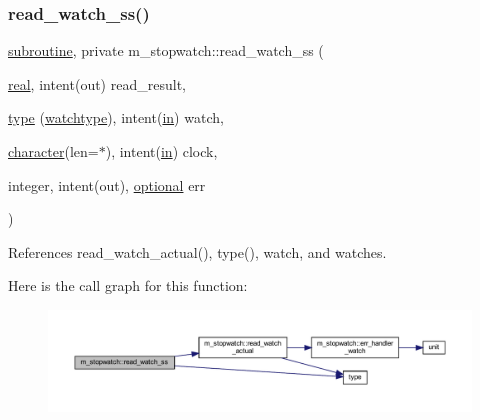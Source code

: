 \subsubsection{\texorpdfstring{read\+\_\+watch\+\_\+ss()}{read\_watch\_ss()}}
{\footnotesize\ttfamily \hyperlink{M__stopwatch_83_8txt_acfbcff50169d691ff02d4a123ed70482}{subroutine}, private m\+\_\+stopwatch\+::read\+\_\+watch\+\_\+ss (\begin{DoxyParamCaption}\item[{\hyperlink{read__watch_83_8txt_abdb62bde002f38ef75f810d3a905a823}{real}, intent(out)}]{read\+\_\+result,  }\item[{\hyperlink{stop__watch_83_8txt_a70f0ead91c32e25323c03265aa302c1c}{type} (\hyperlink{structm__stopwatch_1_1watchtype}{watchtype}), intent(\hyperlink{M__journal_83_8txt_afce72651d1eed785a2132bee863b2f38}{in})}]{watch,  }\item[{\hyperlink{option__stopwatch_83_8txt_abd4b21fbbd175834027b5224bfe97e66}{character}(len=$\ast$), intent(\hyperlink{M__journal_83_8txt_afce72651d1eed785a2132bee863b2f38}{in})}]{clock,  }\item[{integer, intent(out), \hyperlink{option__stopwatch_83_8txt_aa4ece75e7acf58a4843f70fe18c3ade5}{optional}}]{err }\end{DoxyParamCaption})\hspace{0.3cm}{\ttfamily [private]}}



References read\+\_\+watch\+\_\+actual(), type(), watch, and watches.

Here is the call graph for this function\+:
\nopagebreak
\begin{figure}[H]
\begin{center}
\leavevmode
\includegraphics[width=350pt]{namespacem__stopwatch_a89bcd606b0a234679db7c5809e0560f3_cgraph}
\end{center}
\end{figure}
\mbox{\label{namespacem__stopwatch_ae67f8aee930e9258b83b5a551120e4bd}} 
